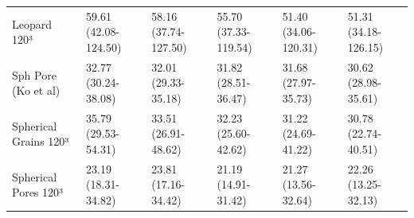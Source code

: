 \begin{tabular}{llllll}
Leopard 120³ & 59.61 (42.08-124.50) & 58.16 (37.74-127.50) & 55.70 (37.33-119.54) & 51.40 (34.06-120.31) & 51.31 (34.18-126.15) \\
Sph Pore (Ko et al) & 32.77 (30.24-38.08) & 32.01 (29.33-35.18) & 31.82 (28.51-36.47) & 31.68 (27.97-35.73) & 30.62 (28.98-35.61) \\
Spherical Grains 120³ & 35.79 (29.53-54.31) & 33.51 (26.91-48.62) & 32.23 (25.60-42.62) & 31.22 (24.69-41.22) & 30.78 (22.74-40.51) \\
Spherical Pores 120³ & 23.19 (18.31-34.82) & 23.81 (17.16-34.42) & 21.19 (14.91-31.42) & 21.27 (13.56-32.64) & 22.26 (13.25-32.13) \\
\bottomrule
\end{tabular}
